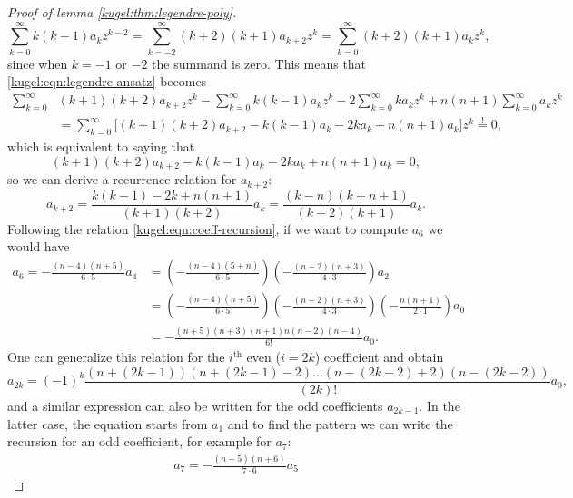 \begin{proof}[Proof of lemma \ref{kugel:thm:legendre-poly}]
\begin{equation*}
    \sum_{k=0}^\infty k (k-1) a_k z^{k-2}
    = \sum_{k=-2}^\infty (k+2)(k+1) a_{k+2} z^k
    = \sum_{k=0}^\infty (k+2)(k+1) a_k z^k,
  \end{equation*}
  since when $k = -1$ or $-2$ the summand is zero. This means that
  \eqref{kugel:eqn:legendre-ansatz} becomes
  \begin{align*}
    \sum_{k=0}^\infty &(k+1)(k+2) a_{k+2} z^{k}
      - \sum_{k=0}^\infty k (k-1) a_k z^{k}
      - 2\sum_{k=0}^\infty k a_k z^k
      + n(n+1)\sum_{k=0}^\infty a_k z^k \nonumber \\
    &= \sum_{k=0}^\infty \big[
      (k+1)(k+2) a_{k+2}
      - k (k-1) a_k
      - 2 k a_k
      + n(n+1) a_k
    \big] z^k \stackrel{!}{=} 0,
  \end{align*}
  which is equivalent to saying that
  \begin{equation*}
    (k+1)(k+2) a_{k+2} - k (k-1) a_k - 2 k a_k + n(n+1) a_k = 0,
  \end{equation*}
  so we can derive a recurrence relation for $a_{k+2}$:
  \begin{equation}
    \label{kugel:eqn:coeff-recursion}
    a_{k+2} = \frac{k (k-1) - 2 k + n(n+1)}{(k+1)(k+2)}a_k
    = \frac{(k-n)(k+n+1)}{(k+2)(k+1)}a_k.
  \end{equation}
  Following the relation \eqref{kugel:eqn:coeff-recursion}, if we want to
  compute $a_6$ we would have
  \begin{align*}
    a_{6} = -\frac{(n-4)(n+5)}{6\cdot 5} a_4
      &= \left( -\frac{(n-4)(5+n)}{6 \cdot 5} \right)
         \left( -\frac{(n-2)(n+3)}{4 \cdot 3} \right) a_2 \\
      &= \left( -\frac{(n-4)(n+5)}{6 \cdot 5} \right)
         \left( -\frac{(n-2)(n+3)}{4 \cdot 3} \right)
         \left( -\frac{n(n+1)}{2 \cdot 1} \right)  a_0 \\
      &= -\frac{(n+5)(n+3)(n+1)n(n-2)(n-4)}{6!} a_0.
  \end{align*}
  One can generalize this relation for the $i^\text{th}$ even ($i = 2k$)
  coefficient and obtain
  \begin{equation*}
    a_{2k} = (-1)^k \frac{(n+(2k-1))(n+(2k-1)-2)
      \hdots (n-(2k-2)+2)(n-(2k-2))}{(2k)!}a_0,
  \end{equation*}
  and a similar expression can also be written for the odd coefficients
  $a_{2k-1}$. In the latter case, the equation starts from $a_1$ and to find the
  pattern we can write the recursion for an odd coefficient, for example for
  $a_7$:
  \begin{align*}
    a_{7} = -\frac{(n-5)(n+6)}{7\cdot 6} a_5

\end{align*}
\end{proof}
